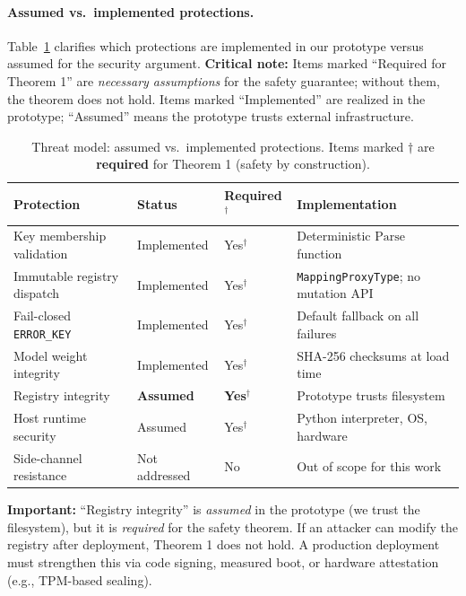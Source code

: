 \documentclass[11pt]{article}
\begin{document}
\paragraph{Assumed vs.\ implemented protections.}
Table~\ref{tab:threat_impl} clarifies which protections are implemented in our prototype versus assumed for the security argument.
\textbf{Critical note:} Items marked ``Required for Theorem 1'' are \emph{necessary assumptions} for the safety guarantee; without them, the theorem does not hold. Items marked ``Implemented'' are realized in the prototype; ``Assumed'' means the prototype trusts external infrastructure.

\begin{table}[h]
\centering
\caption{Threat model: assumed vs.\ implemented protections. Items marked $\dagger$ are \textbf{required} for Theorem 1 (safety by construction).}
\label{tab:threat_impl}
\begin{tabular}{llll}
\toprule
Protection & Status & Required$^\dagger$ & Implementation \\
\midrule
Key membership validation & Implemented & Yes$^\dagger$ & Deterministic $\mathrm{Parse}$ function \\
Immutable registry dispatch & Implemented & Yes$^\dagger$ & \texttt{MappingProxyType}; no mutation API \\
Fail-closed \texttt{ERROR\_KEY} & Implemented & Yes$^\dagger$ & Default fallback on all failures \\
Model weight integrity & Implemented & Yes$^\dagger$ & SHA-256 checksums at load time \\
Registry integrity & \textbf{Assumed} & \textbf{Yes}$^\dagger$ & Prototype trusts filesystem \\
Host runtime security & Assumed & Yes$^\dagger$ & Python interpreter, OS, hardware \\
Side-channel resistance & Not addressed & No & Out of scope for this work \\
\bottomrule
\end{tabular}
\end{table}

\noindent\textbf{Important:} ``Registry integrity'' is \emph{assumed} in the prototype (we trust the filesystem), but it is \emph{required} for the safety theorem. If an attacker can modify the registry after deployment, Theorem 1 does not hold. A production deployment must strengthen this via code signing, measured boot, or hardware attestation (e.g., TPM-based sealing).
\end{document}
